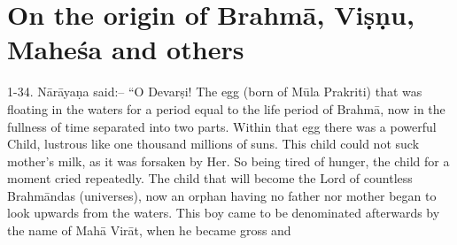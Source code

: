 \chapter{On the origin of Brahm\=a, Vi\d{s}\d{n}u, Mahe\'sa and others}

1-34. N\=ar\=aya\d{n}a said:-- ``O Devar\d{s}i! The egg (born of M\=ula Prakriti) that was floating in the waters for a period equal to the life period of Brahm\=a, now in the fullness of time separated into two parts. Within that egg there was a powerful Child, lustrous like one thousand millions of suns. This child could not suck mother's milk, as it was forsaken by Her. So being tired of hunger, the child for a moment cried repeatedly. The child that will become the Lord of countless Brahm\=andas (universes), now an orphan having no father nor mother began to look upwards from the waters. This boy came to be denominated afterwards by the name of Mah\=a Vir\=at, when he became gross and

